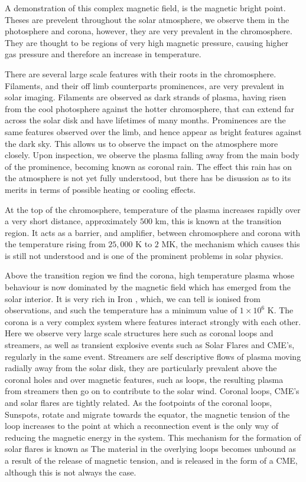 A demonstration of this complex magnetic field, is the magnetic bright point.
Theses are prevelent throughout the solar atmosphere, we observe them in the photosphere and corona, however, they are very prevalent in the chromosphere.
They are thought to be regions of very high magnetic pressure, causing higher gas pressure and therefore an increase in temperature.


There are several large scale features with their roots in the chromosphere.
Filaments, and their off limb counterparts prominences, are very prevalent in solar imaging.
Filaments are observed as dark strands of plasma, having risen from the cool photosphere against the hotter chromosphere, that can extend far across the solar disk and have lifetimes of many months.
Prominences are the same features observed over the limb, and hence appear as bright features against the dark sky.
This allows us to observe the impact on the atmosphere more closely. 
Upon inspection, we observe the plasma falling away from the main body of the prominence, becoming known as coronal rain.
The effect this rain has on the atmosphere is not yet fully understood, but there has be disussion as to its merits in terms of possible heating or cooling effects.

At the top of the chromosphere, temperature of the plasma increases rapidly over a very short distance, approximately $500$ km, this is known at the transition region.
It acts as a barrier, and amplifier, between chromosphere and corona with the temperature rising from $25,000$ K to $2$ MK, the mechanism which causes this is still not understood and is one of the prominent problems in solar physics.

Above the transition region we find the corona, high temperature plasma whose behaviour is now dominated by the magnetic field which has emerged from the solar interior.
It is very rich in Iron , which, we can tell is ionised from observations, and such the temperature has a minimum value of $1 \times 10^6$ K.
The corona is a very complex system where features interact strongly with each other.
Here we observe very large scale structures here such as coronal loops and streamers, as well as transient explosive events such as Solar Flares and CME's, regularly in the same event.
Streamers are self descriptive flows of plasma moving radially away from the solar disk, they are particularly prevalent above the coronal holes and over magnetic features, such as loops, the resulting plasma from streamers then go on to contribute to the solar wind.
Coronal loops, CME's and solar flares are tightly related.
As the footpoints of the coronal loops, Sunspots, rotate and migrate towards the equator, the magnetic tension of the loop increases to the point at which a reconnection event is the only way of reducing the magnetic energy in the system.
This mechanism for the formation of solar flares is known as 
The material in the overlying loops becomes unbound as a result of the release of magnetic tension, and is released in the form of a CME, although this is not always the case.


